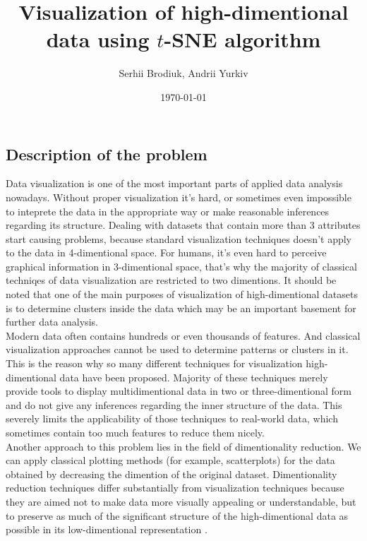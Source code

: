 \documentclass[a4paper]{article}
\title{Visualization of high-dimentional data using $t$-SNE algorithm}
\author{Serhii Brodiuk, Andrii Yurkiv}
\date{\today}
\begin{document}
\maketitle


\subsection*{Description of the problem}

\indent
Data visualization is one of the most important parts of applied data analysis nowadays. Without proper visualization it's hard, or sometimes even impossible to inteprete the data in the appropriate way or make reasonable inferences regarding its structure. Dealing with datasets that contain more than 3 attributes start causing problems, because standard visualization techniques doesn't apply to the data in 4-dimentional space. For humans, it's even hard to perceive graphical information in 3-dimentional space, that's why the majority of classical techniqes of data visualization are restricted to two dimentions. It should be noted that one of the main purposes of visualization of high-dimentional datasets is to determine clusters inside the data which may be an important basement for further data analysis. \\

Modern data often contains hundreds or even thousands of features. And classical visualization approaches cannot be used to determine patterns or clusters in it. This is the reason why so many different techniques for visualization high-dimentional data have been proposed. Majority of these techniques merely provide tools to display multidimentional data in two or three-dimentional form and do not give any inferences regarding the inner structure of the data. This severely limits the applicability of those techniques to real-world data, which sometimes contain too much features to reduce them nicely. \\

Another approach to this problem lies in the field of dimentionality reduction. We can apply classical plotting methods (for example, scatterplots) for the data obtained by decreasing the dimention of the original dataset.  Dimentionality reduction techniques differ substantially from visualization techniques because they are aimed not to make data more visually appealing or understandable, but to preserve as much of the significant structure of the high-dimentional data as possible in its low-dimentional representation \cite{tsnearticle}. \\
\end{document}
